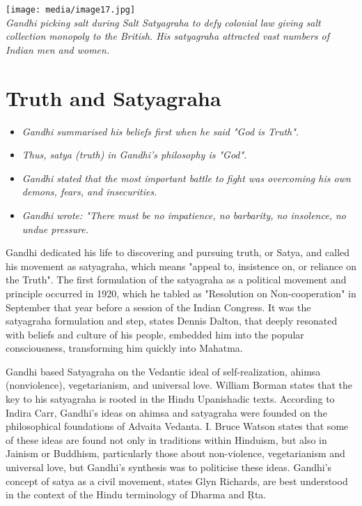 \texttt{[image: media/image17.jpg]}\\
\emph{Gandhi picking salt during Salt Satyagraha to defy colonial law
giving salt collection monopoly to the British. His satyagraha attracted
vast numbers of Indian men and women.}

\section{Truth and Satyagraha}\label{truth-and-satyagraha}

\begin{itemize}
\item
  \emph{Gandhi summarised his beliefs first when he said "God is
  Truth".}
\item
  \emph{Thus, satya (truth) in Gandhi's philosophy is "God".}
\item
  \emph{Gandhi stated that the most important battle to fight was
  overcoming his own demons, fears, and insecurities.}
\item
  \emph{Gandhi wrote: "There must be no impatience, no barbarity, no
  insolence, no undue pressure.}
\end{itemize}

Gandhi dedicated his life to discovering and pursuing truth, or Satya,
and called his movement as satyagraha, which means "appeal to,
insistence on, or reliance on the Truth". The first formulation of the
satyagraha as a political movement and principle occurred in 1920, which
he tabled as "Resolution on Non-cooperation" in September that year
before a session of the Indian Congress. It was the satyagraha
formulation and step, states Dennis Dalton, that deeply resonated with
beliefs and culture of his people, embedded him into the popular
consciousness, transforming him quickly into Mahatma.

Gandhi based Satyagraha on the Vedantic ideal of self-realization,
ahimsa (nonviolence), vegetarianism, and universal love. William Borman
states that the key to his satyagraha is rooted in the Hindu Upanishadic
texts. According to Indira Carr, Gandhi's ideas on ahimsa and satyagraha
were founded on the philosophical foundations of Advaita Vedanta. I.
Bruce Watson states that some of these ideas are found not only in
traditions within Hinduism, but also in Jainism or Buddhism,
particularly those about non-violence, vegetarianism and universal love,
but Gandhi's synthesis was to politicise these ideas. Gandhi's concept
of satya as a civil movement, states Glyn Richards, are best understood
in the context of the Hindu terminology of Dharma and Ṛta.

